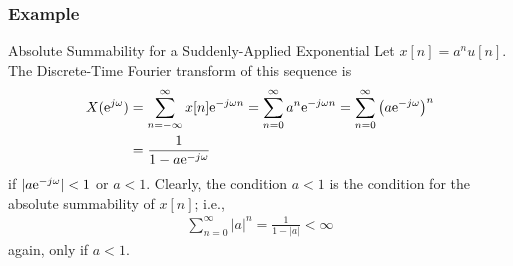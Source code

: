 \documentclass[mathserif,9pt,handout]{beamer}
\begin{document}
\begin{frame}\frametitle{Example}\small
   
   \begin{alertblock}{Absolute Summability for a Suddenly-Applied Exponential}
   Let $x[n] = a^n u[n]$. The Discrete-Time Fourier transform of this sequence is  
   \begin{align}
     X({\textrm{e}}^{j\omega}) &= \sum_{n=-\infty}^{\infty} x[n] {\textrm{e}}^{-j\omega n}
     = \sum_{n=0}^{\infty} a^n {\textrm{e}}^{-j\omega n}
     = \sum_{n=0}^{\infty} \left(a {\textrm{e}}^{-j\omega}\right)^n
     \nonumber \\
     &= \frac{1}{1 - a {\textrm{e}}^{-j\omega}}
   \end{align}
   if $|a {\textrm{e}}^{-j\omega}| < 1$ or $a < 1$. Clearly, the condition $a<1$ is the condition for the absolute summability of $x[n]$; i.e.,
   \begin{align}
      \sum_{n=0}^{\infty} |a|^n = \frac{1}{1-|a|} < \infty
     \nonumber
   \end{align} 
   again, only if $a < 1$. 
   \end{alertblock}
   
\end{frame}
\end{document}

